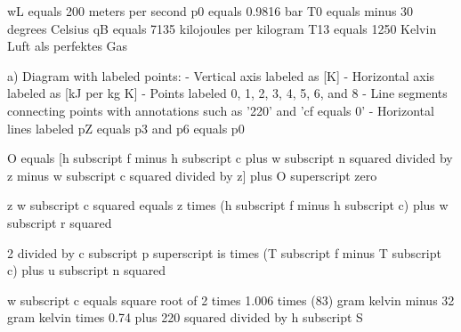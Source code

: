 wL equals 200 meters per second  
p0 equals 0.9816 bar  
T0 equals minus 30 degrees Celsius  
qB equals 7135 kilojoules per kilogram  
T13 equals 1250 Kelvin  
Luft als perfektes Gas  

a)  
Diagram with labeled points:  
- Vertical axis labeled as [K]  
- Horizontal axis labeled as [kJ per kg K]  
- Points labeled 0, 1, 2, 3, 4, 5, 6, and 8  
- Line segments connecting points with annotations such as '220' and 'cf equals 0'  
- Horizontal lines labeled pZ equals p3 and p6 equals p0

O equals [h subscript f minus h subscript c plus w subscript n squared divided by z minus w subscript c squared divided by z] plus O superscript zero

z w subscript c squared equals z times (h subscript f minus h subscript c) plus w subscript r squared

2 divided by c subscript p superscript is times (T subscript f minus T subscript c) plus u subscript n squared

w subscript c equals square root of 2 times 1.006 times (83) gram kelvin minus 32 gram kelvin times 0.74 plus 220 squared divided by h subscript S